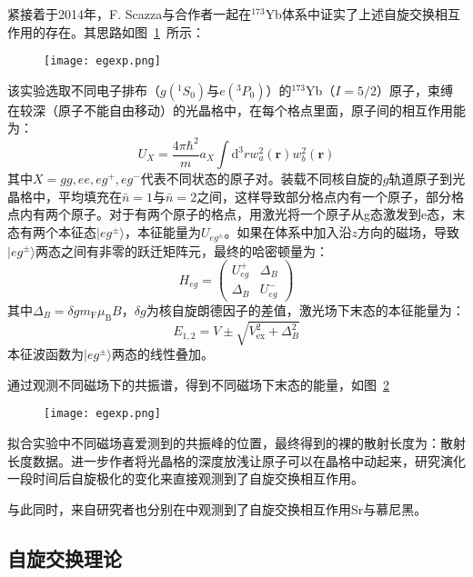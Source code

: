 紧接着于2014年，F. Scazza与合作者一起在${}^{173}$Yb体系中证实了上述自旋交换相互作用的存在。其思路如图~\ref{egexp}~所示：
\begin{figure}[!htbp]
    \centering
    \texttt{[image: egexp.png]}
    \label{egexp}
\end{figure}
该实验选取不同电子排布（$g({}^1S_0)$与$e({}^3P_0)$）的${}^{173}$Yb（$I=5/2$）原子，束缚在较深（原子不能自由移动）的光晶格中，在每个格点里面，原子间的相互作用能为：
\begin{equation}
U_{X}=\frac{4 \pi \hbar^{2}}{m} a_{X} \int \mathrm{d}^{3} r w_{a}^{2}(\mathbf{r}) w_{b}^{2}(\mathbf{r})
\end{equation}
其中$X =gg, ee, eg^+, eg^−$代表不同状态的原子对。装载不同核自旋的$g$轨道原子到光晶格中，平均填充在$\bar{n}=1$与$\bar{n}=2$之间，这样导致部分格点内有一个原子，部分格点内有两个原子。对于有两个原子的格点，用激光将一个原子从g态激发到e态，末态有两个本征态$|eg^\pm\rangle$，本征能量为$U_{eg^\pm}$。如果在体系中加入沿$z$方向的磁场，导致$|eg^\pm\rangle$两态之间有非零的跃迁矩阵元，最终的哈密顿量为：
\begin{equation}
H_{e g}=\left(\begin{array}{cc}
U_{e g}^{+} & \Delta_{B} \\
\Delta_{B} & U_{e g}^{-}
\end{array}\right)
\end{equation}
其中$\Delta_{B}=\delta g m_{\mathrm{F}} \mu_{\mathrm{B}} B$，$\delta g$为核自旋朗德因子的差值，激光场下末态的本征能量为：
\begin{equation}
E_{1,2}=V \pm \sqrt{V_{\mathrm{ex}}^{2}+\Delta_{B}^{2}}
\end{equation}
本征波函数为$|eg^\pm\rangle$两态的线性叠加。

通过观测不同磁场下的共振谱，得到不同磁场下末态的能量，如图~\ref{egd}~
\begin{figure}[!htbp]
    \centering
    \texttt{[image: egexp.png]}
    \label{egd}
\end{figure}
拟合实验中不同磁场喜爱测到的共振峰的位置，最终得到的裸的散射长度为：{\color{red}散射长度数据}。进一步作者将光晶格的深度放浅让原子可以在晶格中动起来，研究演化一段时间后自旋极化的变化来直接观测到了自旋交换相互作用。

与此同时，来自研究者也分别在中观测到了自旋交换相互作用{\color{red}Sr与慕尼黑}。


\subsection{自旋交换理论}

